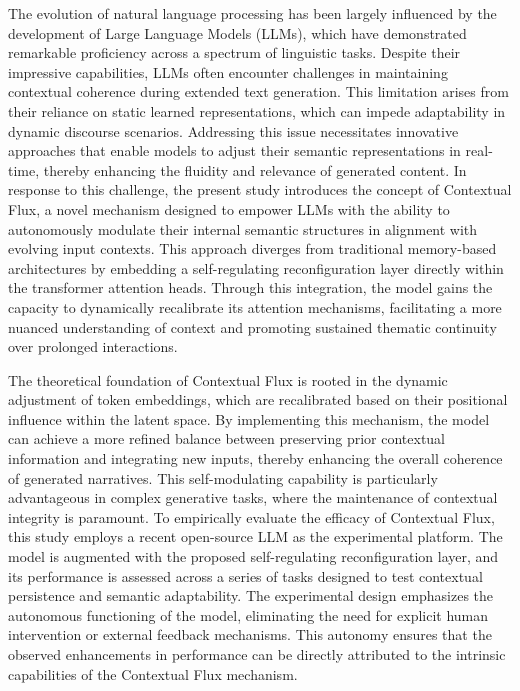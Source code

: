 \documentclass{article}
\begin{document}
The evolution of natural language processing has been largely influenced by the development of Large Language Models (LLMs), which have demonstrated remarkable proficiency across a spectrum of linguistic tasks. Despite their impressive capabilities, LLMs often encounter challenges in maintaining contextual coherence during extended text generation. This limitation arises from their reliance on static learned representations, which can impede adaptability in dynamic discourse scenarios. Addressing this issue necessitates innovative approaches that enable models to adjust their semantic representations in real-time, thereby enhancing the fluidity and relevance of generated content. In response to this challenge, the present study introduces the concept of Contextual Flux, a novel mechanism designed to empower LLMs with the ability to autonomously modulate their internal semantic structures in alignment with evolving input contexts. This approach diverges from traditional memory-based architectures by embedding a self-regulating reconfiguration layer directly within the transformer attention heads. Through this integration, the model gains the capacity to dynamically recalibrate its attention mechanisms, facilitating a more nuanced understanding of context and promoting sustained thematic continuity over prolonged interactions.

The theoretical foundation of Contextual Flux is rooted in the dynamic adjustment of token embeddings, which are recalibrated based on their positional influence within the latent space. By implementing this mechanism, the model can achieve a more refined balance between preserving prior contextual information and integrating new inputs, thereby enhancing the overall coherence of generated narratives. This self-modulating capability is particularly advantageous in complex generative tasks, where the maintenance of contextual integrity is paramount. To empirically evaluate the efficacy of Contextual Flux, this study employs a recent open-source LLM as the experimental platform. The model is augmented with the proposed self-regulating reconfiguration layer, and its performance is assessed across a series of tasks designed to test contextual persistence and semantic adaptability. The experimental design emphasizes the autonomous functioning of the model, eliminating the need for explicit human intervention or external feedback mechanisms. This autonomy ensures that the observed enhancements in performance can be directly attributed to the intrinsic capabilities of the Contextual Flux mechanism.
\end{document}
